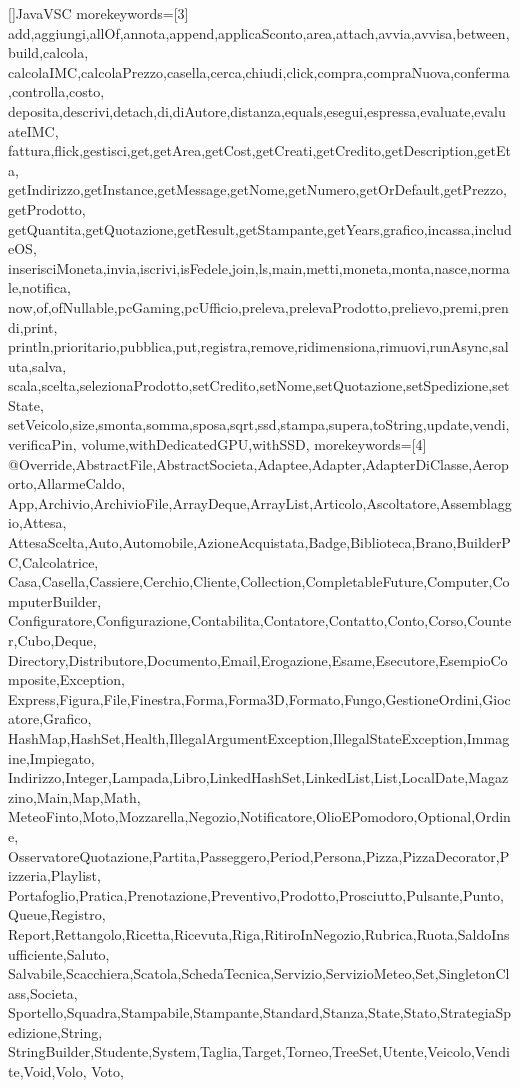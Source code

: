 []{JavaVSC}{
  morekeywords=[3]{
    add,aggiungi,allOf,annota,append,applicaSconto,area,attach,avvia,avvisa,between,build,calcola,
    calcolaIMC,calcolaPrezzo,casella,cerca,chiudi,click,compra,compraNuova,conferma,controlla,costo,
    deposita,descrivi,detach,di,diAutore,distanza,equals,esegui,espressa,evaluate,evaluateIMC,
    fattura,flick,gestisci,get,getArea,getCost,getCreati,getCredito,getDescription,getEta,
    getIndirizzo,getInstance,getMessage,getNome,getNumero,getOrDefault,getPrezzo,getProdotto,
    getQuantita,getQuotazione,getResult,getStampante,getYears,grafico,incassa,includeOS,
    inserisciMoneta,invia,iscrivi,isFedele,join,ls,main,metti,moneta,monta,nasce,normale,notifica,
    now,of,ofNullable,pcGaming,pcUfficio,preleva,prelevaProdotto,prelievo,premi,prendi,print,
    println,prioritario,pubblica,put,registra,remove,ridimensiona,rimuovi,runAsync,saluta,salva,
    scala,scelta,selezionaProdotto,setCredito,setNome,setQuotazione,setSpedizione,setState,
    setVeicolo,size,smonta,somma,sposa,sqrt,ssd,stampa,supera,toString,update,vendi,verificaPin,
    volume,withDedicatedGPU,withSSD},
  morekeywords=[4]{
    @Override,AbstractFile,AbstractSocieta,Adaptee,Adapter,AdapterDiClasse,Aeroporto,AllarmeCaldo,
    App,Archivio,ArchivioFile,ArrayDeque,ArrayList,Articolo,Ascoltatore,Assemblaggio,Attesa,
    AttesaScelta,Auto,Automobile,AzioneAcquistata,Badge,Biblioteca,Brano,BuilderPC,Calcolatrice,
    Casa,Casella,Cassiere,Cerchio,Cliente,Collection,CompletableFuture,Computer,ComputerBuilder,
    Configuratore,Configurazione,Contabilita,Contatore,Contatto,Conto,Corso,Counter,Cubo,Deque,
    Directory,Distributore,Documento,Email,Erogazione,Esame,Esecutore,EsempioComposite,Exception,
    Express,Figura,File,Finestra,Forma,Forma3D,Formato,Fungo,GestioneOrdini,Giocatore,Grafico,
    HashMap,HashSet,Health,IllegalArgumentException,IllegalStateException,Immagine,Impiegato,
    Indirizzo,Integer,Lampada,Libro,LinkedHashSet,LinkedList,List,LocalDate,Magazzino,Main,Map,Math,
    MeteoFinto,Moto,Mozzarella,Negozio,Notificatore,OlioEPomodoro,Optional,Ordine,
    OsservatoreQuotazione,Partita,Passeggero,Period,Persona,Pizza,PizzaDecorator,Pizzeria,Playlist,
    Portafoglio,Pratica,Prenotazione,Preventivo,Prodotto,Prosciutto,Pulsante,Punto,Queue,Registro,
    Report,Rettangolo,Ricetta,Ricevuta,Riga,RitiroInNegozio,Rubrica,Ruota,SaldoInsufficiente,Saluto,
    Salvabile,Scacchiera,Scatola,SchedaTecnica,Servizio,ServizioMeteo,Set,SingletonClass,Societa,
    Sportello,Squadra,Stampabile,Stampante,Standard,Stanza,State,Stato,StrategiaSpedizione,String,
    StringBuilder,Studente,System,Taglia,Target,Torneo,TreeSet,Utente,Veicolo,Vendite,Void,Volo,
    Voto},
}
